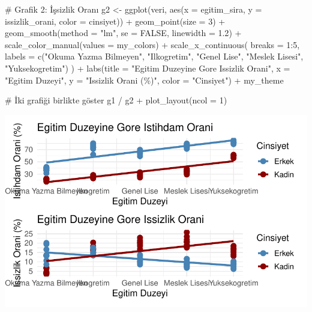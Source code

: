 \documentclass[
  11pt,
  a4paper,
  DIV=11,
  numbers=noendperiod]{scrartcl}
\newenvironment{Shaded}{\begin{snugshade}}{\end{snugshade}}
\newcommand{\AttributeTok}[1]{\textcolor[rgb]{0.40,0.45,0.13}{#1}}
\newcommand{\CommentTok}[1]{\textcolor[rgb]{0.37,0.37,0.37}{#1}}
\newcommand{\ConstantTok}[1]{\textcolor[rgb]{0.56,0.35,0.01}{#1}}
\newcommand{\DecValTok}[1]{\textcolor[rgb]{0.68,0.00,0.00}{#1}}
\newcommand{\FloatTok}[1]{\textcolor[rgb]{0.68,0.00,0.00}{#1}}
\newcommand{\FunctionTok}[1]{\textcolor[rgb]{0.28,0.35,0.67}{#1}}
\newcommand{\NormalTok}[1]{\textcolor[rgb]{0.00,0.23,0.31}{#1}}
\newcommand{\OtherTok}[1]{\textcolor[rgb]{0.00,0.23,0.31}{#1}}
\newcommand{\SpecialCharTok}[1]{\textcolor[rgb]{0.37,0.37,0.37}{#1}}
\newcommand{\StringTok}[1]{\textcolor[rgb]{0.13,0.47,0.30}{#1}}
\begin{document}
\begin{Shaded}
\begin{Highlighting}[]
\CommentTok{\# Grafik 2: İşsizlik Oranı}
\NormalTok{g2 }\OtherTok{\textless{}{-}} \FunctionTok{ggplot}\NormalTok{(veri, }\FunctionTok{aes}\NormalTok{(}\AttributeTok{x =}\NormalTok{ egitim\_sira, }\AttributeTok{y =}\NormalTok{ issizlik\_orani, }\AttributeTok{color =}\NormalTok{ cinsiyet)) }\SpecialCharTok{+}
  \FunctionTok{geom\_point}\NormalTok{(}\AttributeTok{size =} \DecValTok{3}\NormalTok{) }\SpecialCharTok{+}
  \FunctionTok{geom\_smooth}\NormalTok{(}\AttributeTok{method =} \StringTok{"lm"}\NormalTok{, }\AttributeTok{se =} \ConstantTok{FALSE}\NormalTok{, }\AttributeTok{linewidth =} \FloatTok{1.2}\NormalTok{) }\SpecialCharTok{+}
  \FunctionTok{scale\_color\_manual}\NormalTok{(}\AttributeTok{values =}\NormalTok{ my\_colors) }\SpecialCharTok{+}
  \FunctionTok{scale\_x\_continuous}\NormalTok{(}
    \AttributeTok{breaks =} \DecValTok{1}\SpecialCharTok{:}\DecValTok{5}\NormalTok{,}
    \AttributeTok{labels =} \FunctionTok{c}\NormalTok{(}\StringTok{"Okuma Yazma Bilmeyen"}\NormalTok{, }\StringTok{"Ilkogretim"}\NormalTok{, }\StringTok{"Genel Lise"}\NormalTok{, }\StringTok{"Meslek Lisesi"}\NormalTok{, }\StringTok{"Yuksekogretim"}\NormalTok{)}
\NormalTok{  ) }\SpecialCharTok{+}
  \FunctionTok{labs}\NormalTok{(}\AttributeTok{title =} \StringTok{"Egitim Duzeyine Gore Issizlik Orani"}\NormalTok{,}
       \AttributeTok{x =} \StringTok{"Egitim Duzeyi"}\NormalTok{, }\AttributeTok{y =} \StringTok{"Issizlik Orani (\%)"}\NormalTok{, }\AttributeTok{color =} \StringTok{"Cinsiyet"}\NormalTok{) }\SpecialCharTok{+}
\NormalTok{  my\_theme}

\CommentTok{\# İki grafiği birlikte göster}
\NormalTok{g1 }\SpecialCharTok{/}\NormalTok{ g2 }\SpecialCharTok{+} \FunctionTok{plot\_layout}\NormalTok{(}\AttributeTok{ncol =} \DecValTok{1}\NormalTok{)}
\end{Highlighting}
\end{Shaded}

\includegraphics{project_files/figure-pdf/unnamed-chunk-7-1.pdf}
\end{document}
